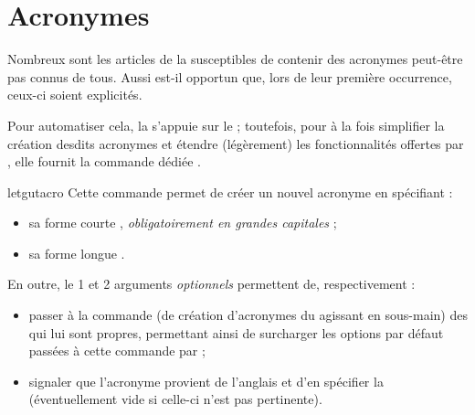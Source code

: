 \documentclass{letgut}
\begin{document}
\section{Acronymes}
\label{sec:acronymes}

Nombreux sont les articles de la  susceptibles de contenir des
acronymes peut-être pas connus de tous. Aussi est-il opportun que, lors de leur
première occurrence, ceux-ci soient explicités.

Pour automatiser cela, la  s'appuie sur le  ;
toutefois, pour à la fois simplifier la création desdits acronymes et étendre
(légèrement) les fonctionnalités offertes par , elle fournit la
commande dédiée .

\begin{docCommand}{letgutacro}{}
  Cette commande permet de créer un nouvel acronyme en spécifiant :
  \begin{itemize}
  \item sa forme courte , \emph{obligatoirement en grandes
      capitales} ;
  \item sa forme longue .
  \end{itemize}
  En outre, le 1\ier{} et 2\ieme{} arguments \emph{optionnels} permettent de,
  respectivement :
  \begin{itemize}
  \item passer à la commande  (de création
    d'acronymes du  agissant en sous-main) des  qui
    lui sont propres, permettant ainsi de surcharger les options par défaut
    passées à cette commande par  ;
  \item signaler que l'acronyme provient de l'anglais et d'en spécifier la
     (éventuellement vide si celle-ci n'est pas
    pertinente).
  \end{itemize}


\end{docCommand}
\end{document}
